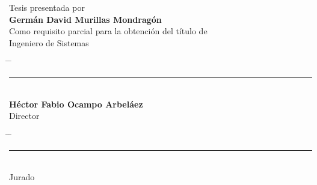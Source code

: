 \vspace*{4cm}
\begin{center}
Tesis presentada por\\
\textbf{Germán David Murillas Mondragón}\\
Como requisito parcial para la obtención del título de\\
Ingeniero de Sistemas
\end{center}
\vfill
\vfill
\vfill
\begin{center}
\begin{tabbing}
\hspace{0.05\textwidth} \= \hspace{0.05\textwidth} \= \kill
\rule{70mm}{0.1mm} \\
\textbf{Héctor Fabio Ocampo Arbeláez}\\
Director
\end{tabbing}
\end{center}
\vfill
\vfill
\vfill
\begin{center}
\begin{tabbing}
\hspace{0.05\textwidth} \= \hspace{0.05\textwidth} \= \kill
\rule{70mm}{0.1mm} \> \rightline{\rule{70mm}{0.1mm}} \\
Jurado \> 
\end{tabbing}
\end{center}
\vfill
\vfill
\vfill
\vfill
